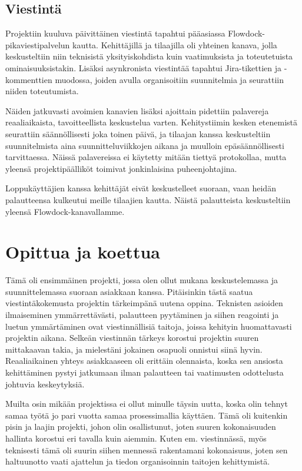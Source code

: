 \documentclass{article}
\begin{document}
\subsection{Viestintä}

Projektiin kuuluva päivittäinen viestintä tapahtui pääasiassa
Flowdock-pikaviestipalvelun kautta. Kehittäjillä ja tilaajilla oli yhteinen
kanava, jolla keskusteltiin niin teknisistä yksityiskohdista kuin vaatimuksista
ja toteutetuista ominaisuuksistakin. Lisäksi asynkronista viestintää tapahtui
Jira-tikettien ja -kommenttien muodossa, joiden avulla organisoitiin
suunnitelmia ja seurattiin niiden toteutumista.

Näiden jatkuvasti avoimien kanavien lisäksi ajoittain pidettiin palavereja
reaaliaikaista, tavoitteellista keskustelua varten. Kehitystiimin kesken
etenemistä seurattiin säännöllisesti joka toinen päivä, ja tilaajan kanssa
keskusteltiin suunnitelmista aina suunnitteluviikkojen aikana ja muulloin
epäsäännöllisesti tarvittaessa. Näissä palavereissa ei käytetty mitään tiettyä
protokollaa, mutta yleensä projektipäälliköt toimivat jonkinlaisina
puheenjohtajina.

Loppukäyttäjien kanssa kehittäjät eivät keskustelleet suoraan, vaan heidän
palautteensa kulkeutui meille tilaajien kautta. Näistä palautteista
keskusteltiin yleensä Flowdock-kanavallamme.

\section{Opittua ja koettua}

Tämä oli ensimmäinen projekti, jossa olen ollut mukana keskustelemassa ja
suunnittelemassa suoraan asiakkaan kanssa. Pitäisinkin tästä saatua
viestintäkokemusta projektin tärkeimpänä uutena oppina. Teknisten asioiden
ilmaiseminen ymmärrettävästi, palautteen pyytäminen ja siihen reagointi ja
luetun ymmärtäminen ovat viestinnällisiä taitoja, joissa kehityin huomattavasti
projektin aikana. Selkeän viestinnän tärkeys korostui projektin suuren
mittakaavan takia, ja mieles\-tä\-ni jokainen osapuoli onnistui siinä hyvin.
Reaaliaikainen yhteys asiakkaaseen oli erittäin olennaista, koska sen ansiosta
kehittäminen pystyi jatkumaan ilman palautteen tai vaatimusten odottelusta
johtuvia keskeytyksiä.

Muilta osin mikään projektissa ei ollut minulle täysin uutta, koska olin tehnyt
samaa työtä jo pari vuotta samaa prosessimallia käyttäen. Tämä oli kuitenkin
pisin ja laajin projekti, johon olin osallistunut, joten suuren kokonaisuuden
hallinta korostui eri tavalla kuin aiemmin. Kuten em. vies\-tinnässä, myös
teknisesti tämä oli suurin siihen mennessä rakentamani kokonaisuus, joten sen
hal\-tuun\-otto vaati ajattelun ja tiedon organisoinnin taitojen kehittymistä.
\end{document}
